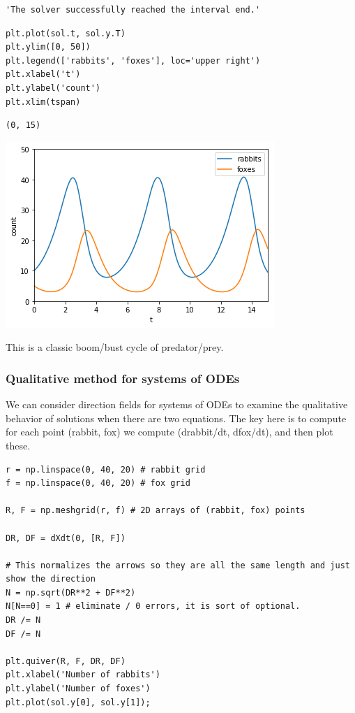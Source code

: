 \documentclass[11pt]{article}
\begin{document}
\begin{verbatim}
'The solver successfully reached the interval end.'
\end{verbatim}

\begin{verbatim}
plt.plot(sol.t, sol.y.T)
plt.ylim([0, 50])
plt.legend(['rabbits', 'foxes'], loc='upper right')
plt.xlabel('t')
plt.ylabel('count')
plt.xlim(tspan)
\end{verbatim}

\begin{verbatim}
(0, 15)
\end{verbatim}



\begin{center}
\includegraphics[width=.9\linewidth]{obipy-resources/05b8b46ebbc2df3b9d545d77190f5234-68311UaN.png}
\end{center}

This is a classic boom/bust cycle of predator/prey.

\subsubsection{Qualitative method for systems of ODEs}
\label{sec:org10c0153}

We can consider direction fields for systems of ODEs to examine the qualitative behavior of solutions when there are two equations. The key here is to compute for each point (rabbit, fox) we compute (drabbit/dt, dfox/dt), and then plot these.

\begin{verbatim}
r = np.linspace(0, 40, 20) # rabbit grid
f = np.linspace(0, 40, 20) # fox grid

R, F = np.meshgrid(r, f) # 2D arrays of (rabbit, fox) points

DR, DF = dXdt(0, [R, F])

# This normalizes the arrows so they are all the same length and just show the direction
N = np.sqrt(DR**2 + DF**2)
N[N==0] = 1 # eliminate / 0 errors, it is sort of optional.
DR /= N
DF /= N

plt.quiver(R, F, DR, DF)
plt.xlabel('Number of rabbits')
plt.ylabel('Number of foxes')
plt.plot(sol.y[0], sol.y[1]);
\end{verbatim}
\end{document}
